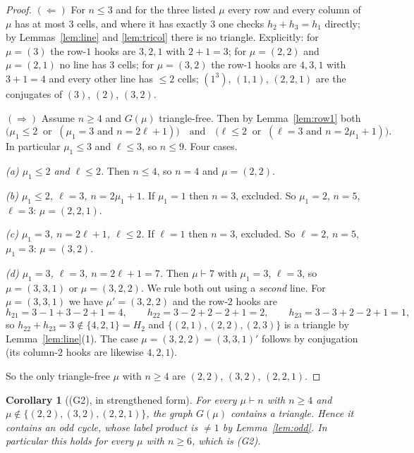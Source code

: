 \documentclass[11pt]{article}
\newtheorem{corollary}[theorem]{Corollary}
\theoremstyle{definition}
\begin{document}
\begin{proof}
$(\Leftarrow)$ For $n\le3$ and for the three listed $\mu$ every row and every column of $\mu$
has at most $3$ cells, and where it has exactly $3$ one checks $h_2+h_3=h_1$ directly; by
Lemmas~\ref{lem:line} and \ref{lem:tricol} there is no triangle. Explicitly: for
$\mu=(3)$ the row-$1$ hooks are $3,2,1$ with $2+1=3$; for $\mu=(2,2)$ and $\mu=(2,1)$ no line
has $3$ cells; for $\mu=(3,2)$ the row-$1$ hooks are $4,3,1$ with $3+1=4$ and every other line
has $\le2$ cells; $(1^3)$, $(1,1)$, $(2,2,1)$ are the conjugates of $(3)$, $(2)$, $(3,2)$.

$(\Rightarrow)$ Assume $n\ge4$ and $G(\mu)$ triangle-free. Then by Lemma~\ref{lem:row1} both
\[
  \bigl(\mu_1\le2 \ \text{ or }\ (\mu_1=3 \text{ and } n=2\ell+1)\bigr)
  \quad\text{and}\quad
  \bigl(\ell\le2 \ \text{ or }\ (\ell=3 \text{ and } n=2\mu_1+1)\bigr).
\]
In particular $\mu_1\le3$ and $\ell\le3$, so $n\le9$. Four cases.

\emph{(a) $\mu_1\le2$ and $\ell\le2$.} Then $n\le4$, so $n=4$ and $\mu=(2,2)$.

\emph{(b) $\mu_1\le2$, $\ell=3$, $n=2\mu_1+1$.} If $\mu_1=1$ then $n=3$, excluded. So
$\mu_1=2$, $n=5$, $\ell=3$: $\mu=(2,2,1)$.

\emph{(c) $\mu_1=3$, $n=2\ell+1$, $\ell\le2$.} If $\ell=1$ then $n=3$, excluded. So $\ell=2$,
$n=5$, $\mu_1=3$: $\mu=(3,2)$.

\emph{(d) $\mu_1=3$, $\ell=3$, $n=2\ell+1=7$.} Then $\mu\vdash7$ with $\mu_1=3$, $\ell=3$, so
$\mu=(3,3,1)$ or $\mu=(3,2,2)$. We rule both out using a \emph{second} line.
For $\mu=(3,3,1)$ we have $\mu'=(3,2,2)$ and the row-$2$ hooks are
\[
  h_{21}=3-1+3-2+1=4,\qquad h_{22}=3-2+2-2+1=2,\qquad h_{23}=3-3+2-2+1=1,
\]
so $h_{22}+h_{23}=3\notin\{4,2,1\}=H_2$ and $\{(2,1),(2,2),(2,3)\}$ is a triangle by
Lemma~\ref{lem:line}(1). The case $\mu=(3,2,2)=(3,3,1)'$ follows by conjugation (its
column-$2$ hooks are likewise $4,2,1$).

So the only triangle-free $\mu$ with $n\ge4$ are $(2,2)$, $(3,2)$, $(2,2,1)$.
\end{proof}

\begin{corollary}[(G2), in strengthened form]\label{cor:G2}
For every $\mu\vdash n$ with $n\ge4$ and $\mu\notin\{(2,2),(3,2),(2,2,1)\}$, the graph
$G(\mu)$ contains a triangle. Hence it contains an odd cycle, whose label product is $\ne1$ by
Lemma~\ref{lem:odd}. In particular this holds for every $\mu$ with $n\ge6$, which is (G2).
\end{corollary}
\end{document}
